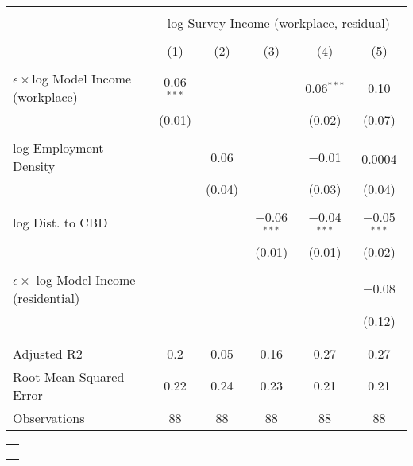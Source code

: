 
\begin{tabular}{@{\extracolsep{5pt}}lccccc} 
\toprule  
\\[-1.8ex] & \multicolumn{5}{c}{log Survey Income (workplace, residual)} \\ 
\\[-1.8ex] & (1) & (2) & (3) & (4) & (5)\\ 
\addlinespace  \\[-1.8ex] 
  $\epsilon \times $log Model Income (workplace) & 0.06$^{***}$ &  &  & 0.06$^{***}$ & 0.10 \\ 
  & (0.01) &  &  & (0.02) & (0.07) \\ 
  & & & & & \\ 
 log Employment Density &  & 0.06 &  & $-$0.01 & $-$0.0004 \\ 
  &  & (0.04) &  & (0.03) & (0.04) \\ 
  & & & & & \\ 
 log Dist. to CBD &  &  & $-$0.06$^{***}$ & $-$0.04$^{***}$ & $-$0.05$^{***}$ \\ 
  &  &  & (0.01) & (0.01) & (0.02) \\ 
  & & & & & \\ 
  $\epsilon \times $ log Model Income (residential) &  &  &  &  & $-$0.08 \\ 
  &  &  &  &  & (0.12) \\ 
  & & & & & \\ 
\addlinespace  \\[-1.8ex] 
Adjusted R2 & 0.2 & 0.05 & 0.16 & 0.27 & 0.27 \\ 
Root Mean Squared Error & 0.22 & 0.24 & 0.23 & 0.21 & 0.21 \\ 
Observations & 88 & 88 & 88 & 88 & 88 \\ 
\bottomrule  
\end{tabular} 

\begin{tabular}{@{\extracolsep{5pt}} c} 
\\[-1.8ex]\addlinespace  
\addlinespace  \\[-1.8ex] 
 \\ 
\addlinespace  \\[-1.8ex] 
\end{tabular} 
